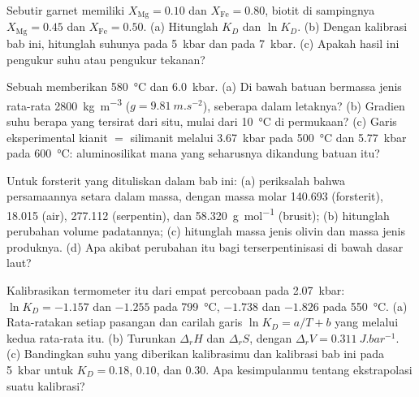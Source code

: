 \begin{exercise}[$\star$]\label{exo:b2:pt-paths:2}
Sebutir garnet memiliki $X_{\text{Mg}} = 0.10$ dan $X_{\text{Fe}} = 0.80$, biotit di sampingnya
$X_{\text{Mg}} = 0.45$ dan $X_{\text{Fe}} = 0.50$. (a) Hitunglah $K_D$ dan $\ln K_D$.
(b) Dengan kalibrasi bab ini, hitunglah suhunya pada \qty{5}{kbar} dan pada
\qty{7}{kbar}. (c) Apakah hasil ini pengukur suhu atau pengukur tekanan?
\end{exercise}

\begin{exercise}[$\star$]\label{exo:b2:pt-paths:3}
Sebuah  memberikan \qty{580}{\celsius} dan \qty{6.0}{kbar}. (a) Di bawah batuan bermassa jenis
rata-rata \qty{2800}{kg.m^{-3}} ($g = \qty{9.81}{m.s^{-2}}$), seberapa dalam letaknya? (b) Gradien
suhu berapa yang tersirat dari situ, mulai dari \qty{10}{\celsius} di permukaan? (c) Garis
eksperimental kianit $=$ silimanit melalui \qty{3.67}{kbar} pada
\qty{500}{\celsius} dan \qty{5.77}{kbar} pada \qty{600}{\celsius}: aluminosilikat mana
yang seharusnya dikandung batuan itu?
\end{exercise}

\begin{exercise}[$\star$]\label{exo:b2:pt-paths:4}
Untuk  forsterit yang dituliskan dalam bab ini: (a) periksalah bahwa
persamaannya setara dalam massa, dengan massa molar 140.693 (forsterit), 18.015 (air),
277.112 (serpentin), dan \qty{58.320}{g.mol^{-1}} (brusit); (b) hitunglah perubahan
volume padatannya; (c) hitunglah massa jenis olivin dan massa jenis produknya.
(d) Apa akibat perubahan itu bagi  terserpentinisasi di bawah dasar laut?
\end{exercise}

\begin{exercise}[$\star\star$]\label{exo:b2:pt-paths:5}
Kalibrasikan termometer itu dari empat percobaan pada \qty{2.07}{kbar}: $\ln K_D =
-1.157$ dan $-1.255$ pada \qty{799}{\celsius}, $-1.738$ dan $-1.826$ pada \qty{550}{\celsius}.
(a) Rata-ratakan setiap pasangan dan carilah garis $\ln K_D = a/T + b$ yang melalui kedua rata-rata itu.
(b) Turunkan $\Delta_r H$ dan $\Delta_r S$, dengan $\Delta_r V = \qty{0.311}{J.bar^{-1}}$.
(c) Bandingkan suhu yang diberikan kalibrasimu dan kalibrasi bab ini pada
\qty{5}{kbar} untuk $K_D = 0.18$, $0.10$, dan $0.30$. Apa kesimpulanmu tentang
ekstrapolasi suatu kalibrasi?
\end{exercise}

